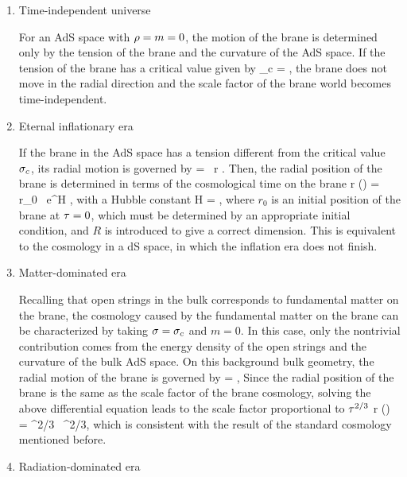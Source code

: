 \documentclass[12pt]{article}
\begin{document}
\begin{enumerate}

\item Time-independent universe

For an AdS space with $\rho=m=0$, the motion of the brane is determined only by the tension of the brane and the curvature of the AdS space. If the tension of the brane has a critical value given by  
\be
\s_c =  ,
\ee
the brane does not move in the radial direction and the scale factor of the brane world becomes time-independent.

\item Eternal inflationary era

If the brane in the AdS space has a tension different from the critical value $\sigma_c$, its radial motion is governed by
\be			{}
   =     \ r   .
\ee
Then, the radial position of the brane is determined in terms of the cosmological time on the brane
\be			{}
r (\ta )  = r_0 \ e^{H \ta} ,
\ee
with a Hubble constant
\be
H =  ,
\ee
where $r_0$ is an initial position of the brane at $\tau=0$, which must be determined by an appropriate initial condition, and $R$ is introduced to give a correct dimension. This is equivalent to the cosmology in a dS space, in which the inflation era does not finish.

\item Matter-dominated era 

Recalling that open strings in the bulk corresponds to fundamental matter on the brane, the cosmology caused by the fundamental matter on the brane can be characterized by taking $\sigma=\sigma_c$ and $m=0$. In this case, only the nontrivial contribution comes from the energy density of the open strings and the curvature of the bulk AdS space. On this background bulk geometry, the radial motion of the brane is governed by
\be
{} =        ,
\ee
Since the radial position of the brane is the same as the scale factor of the brane cosmology, solving the above differential equation leads to the scale factor proportional to $\tau^{2/3}$
\be
r (\ta ) =  \ls {} \rs^{2/3}  \ \ta^{2/3},
\ee
which is consistent with the result of the standard cosmology mentioned before.

\item Radiation-dominated era


\end{enumerate}
\end{document}
